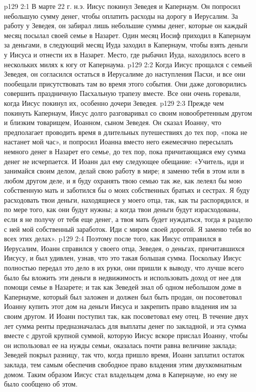 \vs p129 2:1 В марте 22 г. н.э. Иисус покинул Зеведея и Капернаум. Он попросил небольшую сумму денег, чтобы оплатить расходы на дорогу в Иерусалим. За работу у Зеведея, он забирал лишь небольшие суммы денег, которые он каждый месяц посылал своей семье в Назарет. Один месяц Иосиф приходил в Капернаум за деньгами, в следующий месяц Иуда заходил в Капернаум, чтобы взять деньги у Иисуса и отнести их в Назарет. Место, где рыбачил Иуда, находилось всего в нескольких милях к югу от Капернаума.
\vs p129 2:2 Когда Иисус прощался с семьей Зеведея, он согласился остаться в Иерусалиме до наступления Пасхи, и все они пообещали присутствовать там во время этого события. Они даже договорились совершить праздничную Пасхальную трапезу вместе. Все они очень горевали, когда Иисус покинул их, особенно дочери Зеведея.
\vs p129 2:3 \pc Прежде чем покинуть Капернаум, Иисус долго разговаривал со своим новообретенным другом и близким товарищем, Иоанном, сыном Зеведея. Он сказал Иоанну, что предполагает проводить время в длительных путешествиях до тех пор, «пока не настанет мой час», и попросил Иоанна вместо него ежемесячно пересылать немного денег в Назарет его семье, до тех пор, пока причитающаяся ему сумма денег не исчерпается. И Иоанн дал ему следующее обещание: «Учитель, иди и занимайся своим делом, делай свою работу в мире; я заменю тебя в этом или в любом другом деле, и я буду охранять твою семью так же, как лелеял бы мою собственную мать и заботился бы о моих собственных братьях и сестрах. Я буду расходовать твои деньги, находящиеся у моего отца, так, как ты распорядился, и по мере того, как они будут нужны; а когда твои деньги будут израсходованы, если я не получу от тебя еще денег, а твоя мать будет нуждаться, тогда я разделю с ней мой собственный заработок. Иди с миром своей дорогой. Я заменю тебя во всех этих делах».
\vs p129 2:4 Поэтому после того, как Иисус отправился в Иерусалим, Иоанн справился у своего отца, Зеведея, о деньгах, причитавшихся Иисусу, и был удивлен, узнав, что это такая большая сумма. Поскольку Иисус полностью передал это дело в их руки, они пришли к выводу, что лучше всего было бы вложить эти деньги в недвижимость и использовать доход от нее для помощи семье в Назарете; и так как Зеведей знал об одном небольшом доме в Капернауме, который был заложен и должен был быть продан, он посоветовал Иоанну купить этот дом на деньги Иисуса и закрепить право владения им за своим другом. И Иоанн поступил так, как посоветовал ему отец. В течение двух лет сумма ренты предназначалась для выплаты денег по закладной, и эта сумма вместе с другой крупной суммой, которую Иисус вскоре прислал Иоанну, чтобы он использовал ее на нужды семьи, оказалась почти равна величине заклада; Зеведей покрыл разницу, так что, когда пришло время, Иоанн заплатил остаток заклада, тем самым обеспечив свободное право владения этим двухкомнатным домом. Таким образом Иисус стал владельцем дома в Капернауме, но ему не было сообщено об этом.
